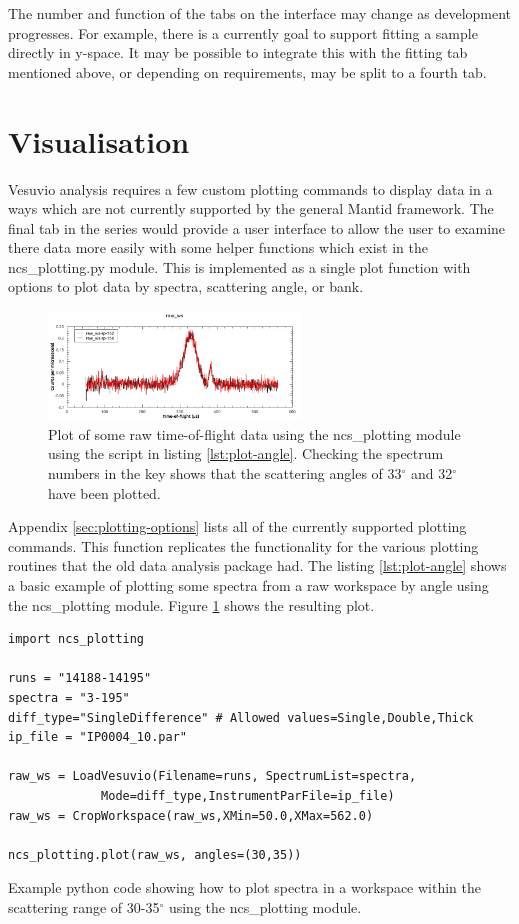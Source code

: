\documentclass[paper=a4, fontsize=11pt]{scrartcl}	%
\numberwithin{equation}{section}															%
\numberwithin{figure}{section}																%
\numberwithin{table}{section}
\begin{document}
The number and function of the tabs on the interface may change as development progresses. For example, there is a currently goal to support fitting a sample directly in y-space. It may be possible to integrate this with the fitting tab mentioned above, or depending on requirements, may be split to a fourth tab.

\section{Visualisation}
\label{sec:visualisation}
Vesuvio analysis requires a few custom plotting commands to display data in a ways which are not currently supported by the general Mantid framework. The final tab in the series would provide a user interface to allow the user to examine there data more easily with some helper functions which exist in the ncs\_plotting.py module. This is implemented as a single plot function with options to plot data by spectra, scattering angle, or bank.

\begin{figure}[H]
\centering
\includegraphics[width=0.6\textwidth]{img/plot-angle.png}
\caption{Plot of some raw time-of-flight data using the ncs\_plotting module using the script in listing \ref{lst:plot-angle}. Checking the spectrum numbers in the key shows that the scattering angles of 33$^\circ$ and 32$^\circ$ have been plotted.}
\label{fig:plot-angle}
\end{figure}

Appendix \ref{sec:plotting-options} lists all of the currently supported plotting commands. This function replicates the functionality for the various plotting routines that the old data analysis package had. The listing \ref{lst:plot-angle} shows a basic example of plotting some spectra from a raw workspace by angle using the ncs\_plotting module. Figure \ref{fig:plot-angle} shows the resulting plot.

\begin{listing}[H]
\begin{verbatim}
import ncs_plotting

runs = "14188-14195"
spectra = "3-195"
diff_type="SingleDifference" # Allowed values=Single,Double,Thick
ip_file = "IP0004_10.par"

raw_ws = LoadVesuvio(Filename=runs, SpectrumList=spectra,
		     Mode=diff_type,InstrumentParFile=ip_file)
raw_ws = CropWorkspace(raw_ws,XMin=50.0,XMax=562.0)

ncs_plotting.plot(raw_ws, angles=(30,35))
\end{verbatim}
\caption{Example python code showing how to plot spectra in a workspace within the scattering range of 30-35$^\circ$ using the ncs\_plotting module.}
\label{lst:plot-angle}
\end{listing}
\end{document}
